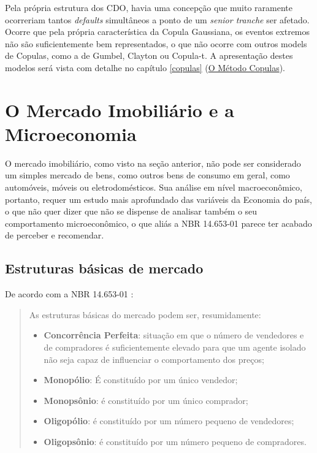 \documentclass[
	12pt,				%
	oneside,			%
	a4paper,			%
	chapter=TITLE,		%
	section=TITLE,		%
	english,			%
	brazil				%
	]{abntex2}
\begin{document}
Pela própria estrutura dos \gls{CDO}, havia uma concepção que muito
raramente ocorreriam tantos \emph{defaults} simultâneos a ponto de um
\emph{senior tranche} ser afetado. Ocorre que pela própria
característica da Copula Gaussiana, os eventos extremos não são
suficientemente bem representados, o que não ocorre com outros models de
Copulas, como a de Gumbel, Clayton ou Copula-t. A apresentação destes
modelos será vista com detalhe no capítulo \ref{copulas}
(\protect\hyperlink{copulas}{O Método Copulas}).

\section{O Mercado Imobiliário e a Microeconomia}\label{micro}

O mercado imobiliário, como visto na seção anterior, não pode ser
considerado um simples mercado de bens, como outros bens de consumo em
geral, como automóveis, móveis ou eletrodomésticos. Sua análise em nível
macroeconômico, portanto, requer um estudo mais aprofundado das
variáveis da Economia do país, o que não quer dizer que não se dispense
de analisar também o seu comportamento microeconômico, o que aliás a NBR
14.653-01 \autocite*{NBR1465301} parece ter acabado de perceber e
recomendar.

\subsection{Estruturas básicas de
mercado}\label{estruturas-buxe1sicas-de-mercado}

De acordo com a NBR 14.653-01 \autocite*[ix]{NBR1465301}:
\begin{quote}
As estruturas básicas do mercado podem ser, resumidamente:
\begin{itemize}
\item
  \textbf{Concorrência Perfeita}: situação em que o número de vendedores
  e de compradores é suficientemente elevado para que um agente isolado
  não seja capaz de influenciar o comportamento dos preços;
\item
  \textbf{Monopólio}: É constituído por um único vendedor;
\item
  \textbf{Monopsônio}: é constituído por um único comprador;
\item
  \textbf{Oligopólio}: é constituído por um número pequeno de
  vendedores;
\item
  \textbf{Oligopsônio}: é constituído por um número pequeno de
  compradores.
\end{itemize}
\end{quote}
\end{document}
